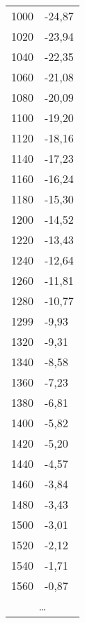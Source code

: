 \begin{footnotesize}
\begin{table}[h]
\begin{tabular}{rl}
1000	&	-24,87\\
1020	&	-23,94\\
1040	&	-22,35\\
1060	&	-21,08\\
1080	&	-20,09\\
1100	&	-19,20\\
1120	&	-18,16\\
1140	&	-17,23\\
1160	&	-16,24\\
1180	&	-15,30\\
1200	&	-14,52\\
1220	&	-13,43\\
1240	&	-12,64\\
1260	&	-11,81\\
1280	&	-10,77\\
1299	&	-9,93\\
1320	&	-9,31\\
1340	&	-8,58\\
1360	&	-7,23\\
1380	&	-6,81\\
1400	&	-5,82\\
1420	&	-5,20\\
1440	&	-4,57\\
1460	&	-3,84\\
1480	&	-3,43\\
1500	&	-3,01\\
1520	&	-2,12\\
1540	&	-1,71\\
1560	&	-0,87\\
\multicolumn{2}{c}{\dots}\\
\end{tabular}
\begin{tabular}{c|c}

\end{tabular}
\end{table}
\end{footnotesize}
